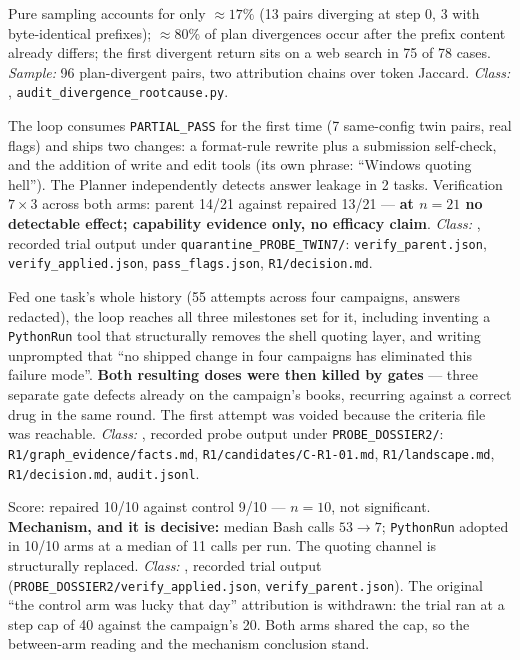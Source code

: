 \begin{description}[leftmargin=0pt,labelindent=0pt,labelsep=0pt,style=nextline,font=\normalfont,itemsep=6pt]
\item[\textbf{F25}\quad Divergence root cause, at content level.]
Pure sampling accounts for only $\approx 17\%$ (13 pairs
diverging at step 0, 3 with byte-identical prefixes); $\approx 80\%$ of
plan divergences occur after the prefix content already differs; the first
divergent return sits on a web search in 75 of 78 cases.
\emph{Sample:} 96 plan-divergent pairs, two attribution
chains over token Jaccard. \emph{Class:} ,
\texttt{audit\_divergence\_rootcause.py}.

\item[\textbf{F26}\quad Twin-feeding probe, end to end.]
The loop consumes \texttt{PARTIAL\_PASS} for the first time (7 same-config
twin pairs, real flags) and ships two changes: a format-rule rewrite plus a
submission self-check, and the addition of write and edit tools (its own
phrase: ``Windows quoting hell''). The Planner independently detects answer
leakage in 2 tasks. Verification $7 \times 3$ across both arms: parent
14/21 against repaired 13/21 --- \textbf{at $n=21$ no detectable effect;
capability evidence only, no efficacy claim}. \emph{Class:} ,
recorded trial output under \texttt{quarantine\_PROBE\_TWIN7/}:
\texttt{verify\_parent.json}, \texttt{verify\_applied.json},
\texttt{pass\_flags.json}, \texttt{R1/decision.md}.

\item[\textbf{F27}\quad Episodic dossier probe, isolated re-run.]
Fed one task's whole history (55 attempts across four campaigns, answers
redacted), the loop reaches all three milestones set for it, including
inventing a \texttt{PythonRun} tool that structurally removes the shell
quoting layer, and writing unprompted that ``no shipped change in four
campaigns has eliminated this failure mode''. \textbf{Both resulting doses
were then killed by gates} --- three separate gate defects already on the
campaign's books, recurring against a correct drug in the same round. The
first attempt was voided because the criteria file was reachable.
\emph{Class:} , recorded probe output under
\texttt{PROBE\_DOSSIER2/}: \texttt{R1/graph\_evidence/facts.md},
\texttt{R1/candidates/C-R1-01.md}, \texttt{R1/landscape.md},
\texttt{R1/decision.md}, \texttt{audit.jsonl}.

\item[\textbf{F28}\quad Trialling a gate-killed drug, $10 \times 10$.]
Score: repaired 10/10 against control 9/10 --- $n=10$, not significant.
\textbf{Mechanism, and it is decisive:} median Bash calls $53 \to 7$;
\texttt{PythonRun} adopted in 10/10 arms at a median of 11 calls per run.
The quoting channel is structurally replaced. \emph{Class:} ,
recorded trial output (\texttt{PROBE\_DOSSIER2/verify\_applied.json},
\texttt{verify\_parent.json}). The
original ``the control arm was lucky that day'' attribution is withdrawn:
the trial ran at a step cap of 40 against the campaign's 20. Both arms
shared the cap, so the between-arm reading and the mechanism conclusion
stand.


\end{description}
